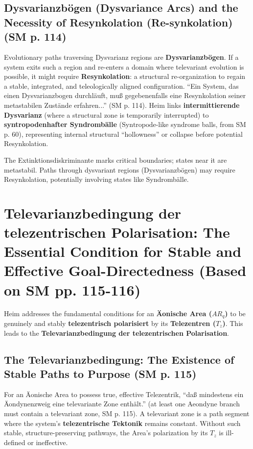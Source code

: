 \documentclass[
    12pt,              %
    a4paper,           %
    headings=normal,   %
    twoside=true,      %
    BCOR=8mm,          %
]{scrbook}
\newcommand{\q}[1]{\enquote{#1}}
\newcommand{\syntropode}{\text{Syntropode}}
\newcommand{\telezentrum}{T_z}
\newcommand{\aeonischearea}{AR_q}
\begin{document}
\subsection{Dysvarianzbögen (Dysvariance Arcs) and the Necessity of Resynkolation (Re-synkolation) (SM p. 114)}
\label{sec:ch6_dysvarianzboegen_resynkolation}
Evolutionary paths traversing Dysvarianz regions are \textbf{Dysvarianzbögen}. If a system exits such a region and re-enters a domain where televariant evolution is possible, it might require \textbf{Resynkolation}: a structural re-organization to regain a stable, integrated, and teleologically aligned configuration. \q{Ein System, das einen Dysvarianzbogen durchläuft, muß gegebenenfalls eine Resynkolation seiner metastabilen Zustände erfahren...} (SM p. 114). Heim links \textbf{intermittierende Dysvarianz} (where a structural zone is temporarily interrupted) to \textbf{syntropodenhafter Syndrombälle} (\(\syntropode\)-like syndrome balls, from SM p. 60), representing internal structural \q{hollowness} or collapse before potential Resynkolation.

The Extinktionsdiskriminante marks critical boundaries; states near it are metastabil. Paths through dysvariant regions (Dysvarianzbögen) may require Resynkolation, potentially involving states like Syndrombälle.

\section{Televarianzbedingung der telezentrischen Polarisation: The Essential Condition for Stable and Effective Goal-Directedness (Based on SM pp. 115-116)}
\label{sec:ch6_televarianzbedingung}

Heim addresses the fundamental conditions for an \textbf{Äonische Area (\(\aeonischearea\))} to be genuinely and stably \textbf{telezentrisch polarisiert} by its \textbf{Telezentren (\(\telezentrum\))}. This leads to the \textbf{Televarianzbedingung der telezentrischen Polarisation}.

\subsection{The Televarianzbedingung: The Existence of Stable Paths to Purpose (SM p. 115)}
\label{sec:ch6_televarianz_condition}
For an Äonische Area to possess true, effective Telezentrik, \q{daß mindestens ein Äondynenzweig eine televariante Zone enthält.} (at least one Aeondyne branch must contain a televariant zone, SM p. 115). A televariant zone is a path segment where the system’s \textbf{telezentrische Tektonik} remains constant. Without such stable, structure-preserving pathways, the Area's polarization by its \(\telezentrum\) is ill-defined or ineffective.
\end{document}
